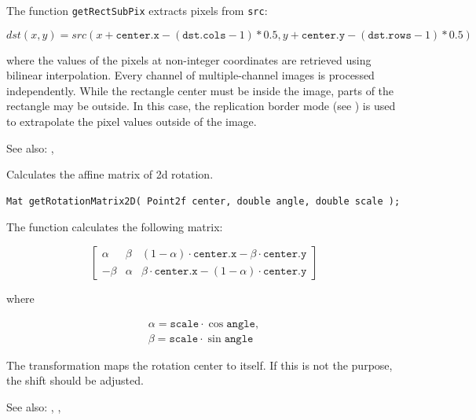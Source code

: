 The function \texttt{getRectSubPix} extracts pixels from \texttt{src}:

\[
dst(x, y) = src(x + \texttt{center.x} - (\texttt{dst.cols}-1)*0.5, y + \texttt{center.y} - (\texttt{dst.rows}-1)*0.5)
\]

where the values of the pixels at non-integer coordinates are retrieved
using bilinear interpolation. Every channel of multiple-channel
images is processed independently. While the rectangle center
must be inside the image, parts of the rectangle may be
outside. In this case, the replication border mode (see ) is used to extrapolate
the pixel values outside of the image.

See also: , 

\label{getRotationMatrix2D}
Calculates the affine matrix of 2d rotation.

\begin{lstlisting}
Mat getRotationMatrix2D( Point2f center, double angle, double scale );
\end{lstlisting}
\begin{description}
\end{description}

The function calculates the following matrix:

\[
\begin{bmatrix}
\alpha & \beta & (1-\alpha) \cdot \texttt{center.x} - \beta \cdot \texttt{center.y} \\
-\beta & \alpha & \beta \cdot \texttt{center.x} - (1-\alpha) \cdot \texttt{center.y}
\end{bmatrix}
\]

where

\[
\begin{array}{l}
\alpha = \texttt{scale} \cdot \cos \texttt{angle},\\
\beta = \texttt{scale} \cdot \sin \texttt{angle}
\end{array}
\]

The transformation maps the rotation center to itself. If this is not the purpose, the shift should be adjusted.

See also: , , 

